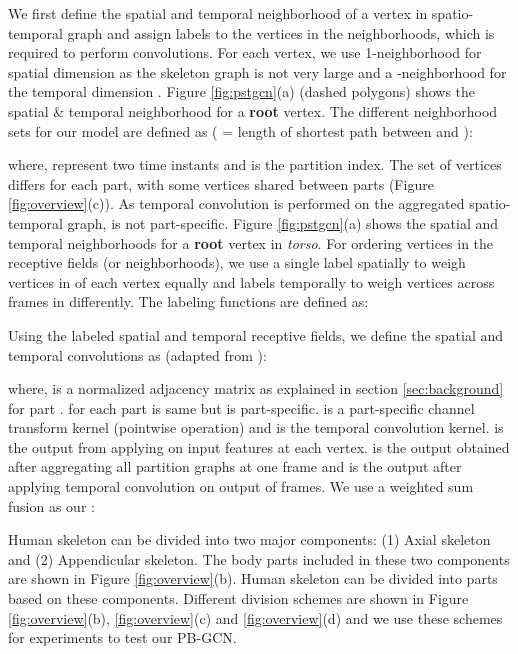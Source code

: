 \documentclass{bmvc2k}
\begin{document}
We first define the spatial and temporal neighborhood of a vertex in spatio-temporal graph and assign labels to the vertices in the neighborhoods, which is required to perform convolutions. For each vertex, we use 1-neighborhood  for spatial dimension  as the skeleton graph is not very large and a -neighborhood  for the temporal dimension . Figure \ref{fig:pstgcn}(a) (dashed polygons) shows the spatial \& temporal neighborhood for a \textbf{root} vertex. The different neighborhood sets for our model are defined as ( = length of shortest path between  and ):
\begingroup
\small

\endgroup
where,  represent two time instants and  is the partition index. The set of vertices  differs for each part, with some vertices shared between parts (Figure \ref{fig:overview}(c)). As temporal convolution is performed on the aggregated spatio-temporal graph,  is not part-specific. Figure \ref{fig:pstgcn}(a) shows the spatial and temporal neighborhoods for a \textbf{root} vertex in \textit{torso}. For ordering vertices in the receptive fields (or neighborhoods), we use a single label spatially  to weigh vertices in  of each vertex equally and  labels temporally  to weigh vertices across frames in  differently. The labeling functions are defined as:
\begingroup
\small

\endgroup
Using the labeled spatial and temporal receptive fields, we define the spatial and temporal convolutions as (adapted from \cite{kipf2016semi}):
\begingroup
\small

\endgroup
where,  is a normalized adjacency matrix as explained in section \ref{sec:background} for part .  for each part is same but  is part-specific.  is a part-specific channel transform kernel (pointwise operation) and  is the temporal convolution kernel.  is the output from applying  on input features  at each vertex.  is the output obtained after aggregating all partition graphs at one frame and  is the output after applying temporal convolution on  output of  frames. We use a weighted sum fusion as our :
\begingroup
\small

\endgroup

Human skeleton can be divided into two major components: (1) Axial skeleton and (2) Appendicular skeleton. The body parts included in these two components are shown in Figure \ref{fig:overview}(b). Human skeleton can be divided into parts based on these components. Different division schemes are shown in Figure \ref{fig:overview}(b), \ref{fig:overview}(c) and \ref{fig:overview}(d) and we use these schemes for experiments to test our PB-GCN.
\end{document}
